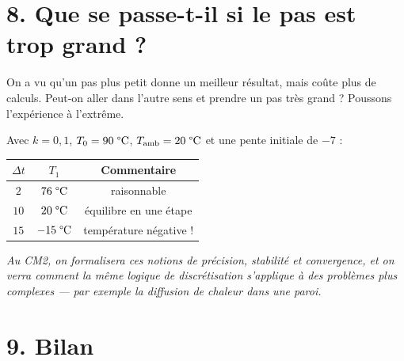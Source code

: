\section*{8. Que se passe-t-il si le pas est trop grand ?}

On a vu qu'un pas plus petit donne un meilleur résultat,
mais coûte plus de calculs.
Peut-on aller dans l'autre sens et prendre un pas très grand ?
Poussons l'expérience à l'extrême.

\medskip

Avec $k = 0{,}1$, $T_0 = 90\;\text{\textdegree C}$, $T_{\mathrm{amb}} = 20\;\text{\textdegree C}$
et une pente initiale de $-7$ :

\begin{center}
\renewcommand{\arraystretch}{1.4}
\begin{tabular}{ccc}
  \hline
  $\Delta t$ & $T_1$ & Commentaire \\
  \hline
  $2$ & $76\;\text{\textdegree C}$ & raisonnable \\
  $10$ & $20\;\text{\textdegree C}$ & équilibre en une étape \\
  $15$ & $-15\;\text{\textdegree C}$ & température négative ! \\
  \hline
\end{tabular}
\end{center}

\medskip


\medskip

\textit{Au CM2, on formalisera ces notions de précision,
stabilité et convergence, et on verra comment la même
logique de discrétisation s'applique à des problèmes
plus complexes --- par exemple la diffusion de chaleur
dans une paroi.}

\section*{9. Bilan}

